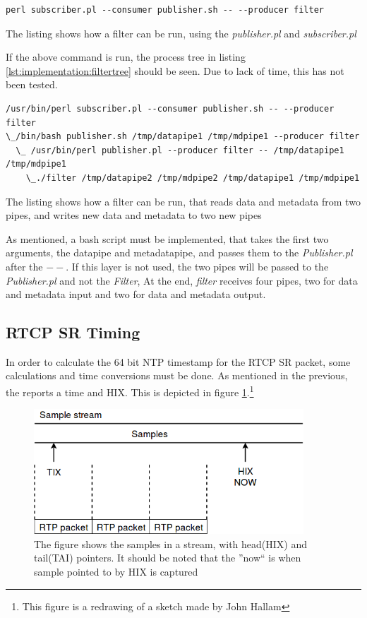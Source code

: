 \begin{listing}[H] 
\begin{verbatim}
perl subscriber.pl --consumer publisher.sh -- --producer filter
\end{verbatim}
\caption{The listing shows how a filter can be run, using the \textit{publisher.pl} and \textit{subscriber.pl}}
\label{lst:implementation:filter}
\end{listing}

If the above command is run, the process tree in listing \ref{lst:implementation:filtertree} should be seen. Due to lack of time, this has not been tested.

\begin{listing}[H] 
\begin{verbatim}
/usr/bin/perl subscriber.pl --consumer publisher.sh -- --producer filter
\_/bin/bash publisher.sh /tmp/datapipe1 /tmp/mdpipe1 --producer filter
  \_ /usr/bin/perl publisher.pl --producer filter -- /tmp/datapipe1 /tmp/mdpipe1
    \_./filter /tmp/datapipe2 /tmp/mdpipe2 /tmp/datapipe1 /tmp/mdpipe1
\end{verbatim}
\caption{The listing shows how a filter can be run, that reads data and metadata from two pipes, and writes new data and metadata to two new pipes}
\label{lst:implementation:filter}
\end{listing}
As mentioned, a bash script must be implemented, that takes the first two arguments, the datapipe and metadatapipe, and passes them to the \textit{Publisher.pl} after the $--$. If this layer is not used, the two pipes will be passed to the \textit{Publisher.pl} and not the \textit{Filter}, At the end, \textit{filter} receives four pipes, two for data and metadata input and two for data and metadata output.

\subsection{RTCP SR Timing} \label{sec:design:rtcpsr}
In order to calculate the 64 bit NTP timestamp for the RTCP SR packet, some calculations and time conversions must be done. As mentioned in the previous, the  reports a time and \ac{HIX}. This is depicted in figure \ref{fig:implementation:rtcpsr}.\footnote{This figure is a redrawing of a sketch made by John Hallam}
\begin{figure}[H]
	\centering
	\includegraphics[width=0.9\textwidth]{figures/rtcp_sr_timing}
	\caption{The figure shows the samples in a stream, with head(HIX) and tail(TAI) pointers. It should be noted that the ''now`` is when sample pointed to by HIX is captured}\label{fig:implementation:rtcpsr}
\end{figure}

